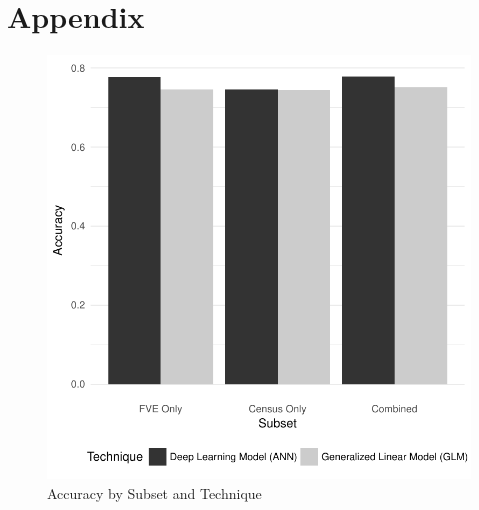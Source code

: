 \documentclass[12pt]{article}
\begin{document}
\nocite{*}

\clearpage
\appendix
\section{Appendix}



\clearpage




\clearpage


\clearpage


\clearpage
\begin{landscape}

\end{landscape}

\clearpage
\begin{figure}
\centering \caption{Accuracy by Subset and Technique} \label{accuracy}
\includegraphics{Graphic003.pdf}
\end{figure}

\clearpage

\end{document}
